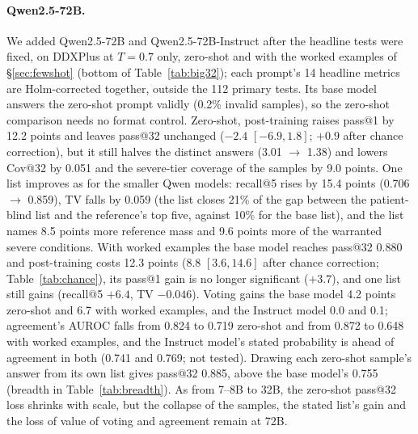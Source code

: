 \documentclass[wcp]{jmlr}
\begin{document}
\paragraph{Qwen2.5-72B.} We added Qwen2.5-72B and Qwen2.5-72B-Instruct after the headline tests were fixed, on DDXPlus at $T{=}0.7$ only, zero-shot and with the worked examples of \S\ref{sec:fewshot} (bottom of Table~\ref{tab:big32}); each prompt's 14 headline metrics are Holm-corrected together, outside the 112 primary tests. Its base model answers the zero-shot prompt validly (0.2\% invalid samples), so the zero-shot comparison needs no format control. Zero-shot, post-training raises pass@1 by 12.2 points and leaves pass@32 unchanged ($-2.4$ $[-6.9,1.8]$; $+0.9$ after chance correction), but it still halves the distinct answers (3.01 $\rightarrow$ 1.38) and lowers Cov@32 by 0.051 and the severe-tier coverage of the samples by 9.0 points. One list improves as for the smaller Qwen models: recall@5 rises by 15.4 points (0.706 $\rightarrow$ 0.859), TV falls by 0.059 (the list closes 21\% of the gap between the patient-blind list and the reference's top five, against 10\% for the base list), and the list names 8.5 points more reference mass and 9.6 points more of the warranted severe conditions. With worked examples the base model reaches pass@32 0.880 and post-training costs 12.3 points (8.8 $[3.6,14.6]$ after chance correction; Table~\ref{tab:chance}), its pass@1 gain is no longer significant ($+3.7$), and one list still gains (recall@5 $+6.4$, TV $-0.046$). Voting gains the base model 4.2 points zero-shot and 6.7 with worked examples, and the Instruct model 0.0 and 0.1; agreement's AUROC falls from 0.824 to 0.719 zero-shot and from 0.872 to 0.648 with worked examples, and the Instruct model's stated probability is ahead of agreement in both (0.741 and 0.769; not tested). Drawing each zero-shot sample's answer from its own list gives pass@32 0.885, above the base model's 0.755 (breadth in Table~\ref{tab:breadth}). As from 7--8B to 32B, the zero-shot pass@32 loss shrinks with scale, but the collapse of the samples, the stated list's gain and the loss of value of voting and agreement remain at 72B.
\end{document}
